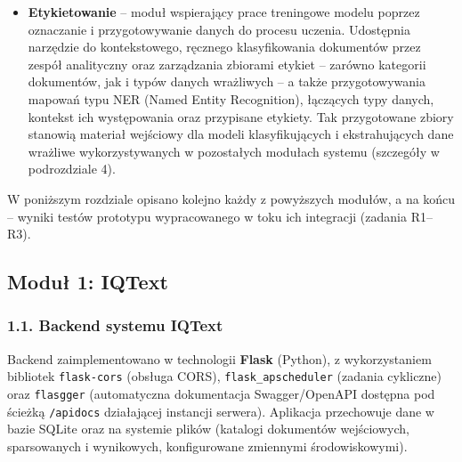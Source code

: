 \begin{itemize}
\item \textbf{Etykietowanie} -- moduł wspierający prace treningowe modelu poprzez oznaczanie i przygotowywanie danych do procesu uczenia. Udostępnia narzędzie do kontekstowego, ręcznego klasyfikowania dokumentów przez zespół analityczny oraz zarządzania zbiorami etykiet -- zarówno kategorii dokumentów, jak i typów danych wrażliwych -- a także przygotowywania mapowań typu NER (Named Entity Recognition), łączących typy danych, kontekst ich występowania oraz przypisane etykiety. Tak przygotowane zbiory stanowią materiał wejściowy dla modeli klasyfikujących i ekstrahujących dane wrażliwe wykorzystywanych w pozostałych modułach systemu (szczegóły w podrozdziale 4).
\end{itemize}

W poniższym rozdziale opisano kolejno każdy z powyższych modułów, a na końcu -- wyniki testów prototypu wypracowanego w toku ich integracji (zadania R1--R3).

\subsection*{Moduł 1: IQText}

\subsubsection*{1.1. Backend systemu IQText}

Backend zaimplementowano w technologii \textbf{Flask} (Python), z wykorzystaniem bibliotek \texttt{flask-cors} (obsługa CORS), \texttt{flask\_apscheduler} (zadania cykliczne) oraz \texttt{flasgger} (automatyczna dokumentacja Swagger/OpenAPI dostępna pod ścieżką \texttt{/apidocs} działającej instancji serwera). Aplikacja przechowuje dane w bazie SQLite oraz na systemie plików (katalogi dokumentów wejściowych, sparsowanych i wynikowych, konfigurowane zmiennymi środowiskowymi).

